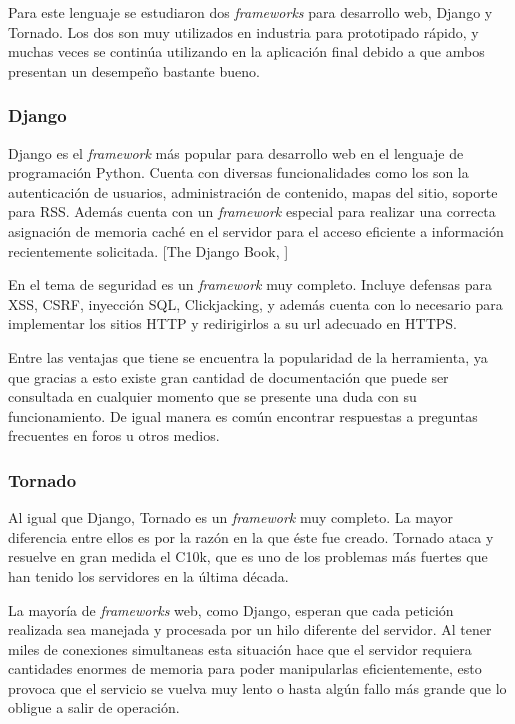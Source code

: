 Para este lenguaje se estudiaron dos \textit{frameworks} para desarrollo web, Django y Tornado. Los dos son muy utilizados en industria para prototipado rápido, y muchas veces se continúa utilizando en la aplicación final debido a que ambos presentan un desempeño bastante bueno.

\subsubsection{Django}

Django es el \textit{framework} más popular para desarrollo web en el lenguaje de programación Python. Cuenta con diversas funcionalidades como los son la autenticación de usuarios, administración de contenido, mapas del sitio, soporte para RSS. Además cuenta con un \textit{framework} especial para realizar una correcta asignación de memoria caché en el servidor para el acceso eficiente a información recientemente solicitada. [The Django Book, \citet*{django}]

En el tema de seguridad es un \textit{framework} muy completo. Incluye defensas para XSS, CSRF, inyección SQL, Clickjacking, y además cuenta con lo necesario para implementar los sitios HTTP y redirigirlos a su url adecuado en HTTPS. 

Entre las ventajas que tiene se encuentra la popularidad de la herramienta, ya que gracias a esto existe gran cantidad de documentación que puede ser consultada en cualquier momento que se presente una duda con su funcionamiento. De igual manera es común encontrar respuestas a preguntas frecuentes en foros u otros medios.

\subsubsection{Tornado}

Al igual que Django, Tornado es un \textit{framework} muy completo. La mayor diferencia entre ellos es por la razón en la que éste fue creado. Tornado ataca y resuelve en gran medida el C10k, que es uno de los problemas más fuertes que han tenido los servidores en la última década. 

La mayoría de \textit{frameworks} web, como Django, esperan que cada petición realizada sea manejada y procesada por un hilo diferente del servidor. Al tener miles de conexiones simultaneas esta situación hace que el servidor requiera cantidades enormes de memoria para poder manipularlas eficientemente, esto provoca que el servicio se vuelva muy lento o hasta algún fallo más grande que lo obligue a salir de operación.


